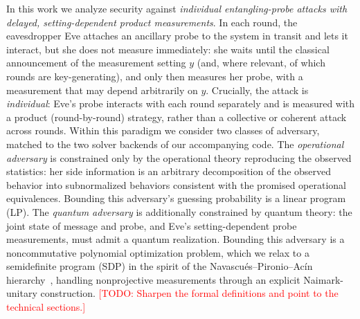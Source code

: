 \documentclass[aps,pra,twocolumn,superscriptaddress,longbibliography,nofootinbib]{revtex4-2}
\newcommand{\todo}[1]{\textcolor{red}{[TODO: #1]}}
\begin{document}
In this work we analyze security against \emph{individual
entangling-probe attacks with delayed, setting-dependent product
measurements}. In each round, the eavesdropper Eve attaches an ancillary
probe to the system in transit and lets it interact, but she does not
measure immediately: she waits until the classical announcement of the
measurement setting $y$ (and, where relevant, of which rounds are
key-generating), and only then measures her probe, with a measurement
that may depend arbitrarily on $y$. Crucially, the attack is
\emph{individual}: Eve's probe interacts with each round separately and
is measured with a product (round-by-round) strategy, rather than a
collective or coherent attack across rounds. Within this paradigm we
consider two classes of adversary, matched to the two solver backends of
our accompanying code. The \emph{operational adversary} is constrained
only by the operational theory reproducing the observed statistics: her
side information is an arbitrary decomposition of the observed behavior
into subnormalized behaviors consistent with the promised operational
equivalences. Bounding this adversary's guessing probability is a linear
program (LP). The \emph{quantum adversary} is additionally constrained
by quantum theory: the joint state of message and probe, and Eve's
setting-dependent probe measurements, must admit a quantum realization.
Bounding this adversary is a noncommutative polynomial optimization
problem, which we relax to a semidefinite program (SDP) in the spirit of
the Navascu\'es--Pironio--Ac\'in hierarchy~\cite{NPA2008}, handling
nonprojective measurements through an explicit Naimark-unitary
construction. \todo{Sharpen the formal definitions and point to the
technical sections.}
\end{document}
